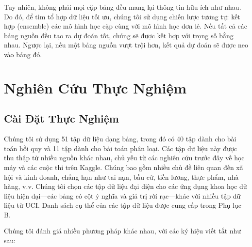 \documentclass{article}
\begin{document}
Tuy nhiên, không phải mọi cặp bảng đều mang lại thông tin hữu ích như nhau. Do đó, để tìm tổ hợp dữ liệu tối ưu, chúng tôi sử dụng chiến lược tương tự: kết hợp (ensemble) các mô hình học cặp cùng với mô hình học đơn lẻ. Nếu tất cả các bảng nguồn đều tạo ra dự đoán tốt, chúng sẽ được kết hợp với trọng số bằng nhau. Ngược lại, nếu một bảng nguồn vượt trội hơn, kết quả dự đoán sẽ được neo vào bảng đó.

\section{Nghiên Cứu Thực Nghiệm}
\subsection{Cài Đặt Thực Nghiệm}
Chúng tôi sử dụng 51 tập dữ liệu dạng bảng, trong đó có 40 tập dành cho bài toán hồi quy và 11 tập dành cho bài toán phân loại. Các tập dữ liệu này được thu thập từ nhiều nguồn khác nhau, chủ yếu từ các nghiên cứu trước đây về học máy và các cuộc thi trên Kaggle. Chúng bao gồm nhiều chủ đề liên quan đến xã hội và kinh doanh, chẳng hạn như tai nạn, bầu cử, tiền lương, thực phẩm, nhà hàng, v.v. Chúng tôi chọn các tập dữ liệu đại diện cho các ứng dụng khoa học dữ liệu hiện đại—các bảng có cột ý nghĩa và giá trị rời rạc—khác với nhiều tập dữ liệu từ UCI. Danh sách cụ thể của các tập dữ liệu được cung cấp trong Phụ lục B.

Chúng tôi đánh giá nhiều phương pháp khác nhau, với các ký hiệu viết tắt như sau:
\end{document}
